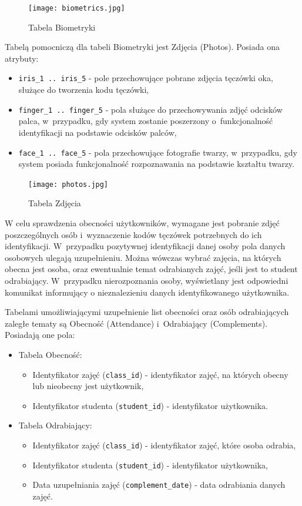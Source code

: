 \begin{figure}
\begin{center}
\texttt{[image: biometrics.jpg]}
\caption{Tabela Biometryki}
\label{fig:biometrics}
\end{center}
\end{figure}

Tabelą pomocniczą dla tabeli Biometryki jest Zdjęcia (Photos). Posiada ona atrybuty:
\begin{itemize}
\item \verb!iris_1 .. iris_5! - pole przechowujące pobrane zdjęcia tęczówki oka, służące do tworzenia kodu tęczówki,
\item \verb!finger_1 .. finger_5! - pola służące do przechowywania zdjęć odcisków palca, w~przypadku, gdy system zostanie poszerzony o~funkcjonalność identyfikacji na podstawie odcisków palców,
\item \verb!face_1 .. face_5! - pola przechowujące fotografie twarzy, w~przypadku, gdy system posiada funkcjonalność rozpoznawania na podstawie kształtu twarzy.
\end{itemize}

\begin{figure}
\begin{center}
\texttt{[image: photos.jpg]}
\caption{Tabela Zdjęcia}
\label{fig:photos}
\end{center}
\end{figure}

W celu sprawdzenia obecności użytkowników, wymagane jest pobranie zdjęć poszczególnych osób i~wyznaczenie kodów tęczówek potrzebnych do ich identyfikacji. W~przypadku pozytywnej identyfikacji danej osoby pola danych osobowych ulegają uzupełnieniu. Można wówczas wybrać zajęcia, na których obecna jest osoba, oraz ewentualnie temat odrabianych zajęć, jeśli jest to student odrabiający. W~przypadku nierozpoznania osoby, wyświetlany jest odpowiedni komunikat informujący o nieznalezieniu danych identyfikowanego użytkownika.

Tabelami umożliwiającymi uzupełnienie list obecności oraz osób odrabiających zaległe tematy są Obecność (Attendance) i~Odrabiający (Complements). Posiadają one pola:
\begin{itemize}
\item Tabela Obecność:
\begin{itemize}
\item Identyfikator zajęć (\verb!class_id!) - identyfikator zajęć, na których obecny lub nieobecny jest użytkownik,
\item Identyfikator studenta (\verb!student_id!) - identyfikator użytkownika.
\end{itemize}
\item Tabela Odrabiający:
\begin{itemize}
\item Identyfikator zajęć (\verb!class_id!) - identyfikator zajęć, które osoba odrabia,
\item Identyfikator studenta (\verb!student_id!) - identyfikator użytkownika,
\item Data uzupełniania zajęć (\verb!complement_date!) - data odrabiania danych zajęć.
\end{itemize}
\end{itemize}

